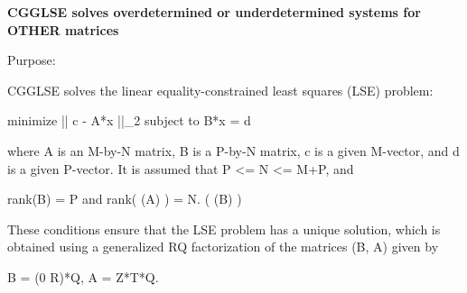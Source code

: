 {\bfseries  C\+G\+G\+L\+S\+E solves overdetermined or underdetermined systems for O\+T\+H\+E\+R matrices} 

 \begin{DoxyParagraph}{Purpose\+: }
\begin{DoxyVerb} CGGLSE solves the linear equality-constrained least squares (LSE)
 problem:

         minimize || c - A*x ||_2   subject to   B*x = d

 where A is an M-by-N matrix, B is a P-by-N matrix, c is a given
 M-vector, and d is a given P-vector. It is assumed that
 P <= N <= M+P, and

          rank(B) = P and  rank( (A) ) = N.
                               ( (B) )

 These conditions ensure that the LSE problem has a unique solution,
 which is obtained using a generalized RQ factorization of the
 matrices (B, A) given by

    B = (0 R)*Q,   A = Z*T*Q.\end{DoxyVerb}
 
\end{DoxyParagraph}

